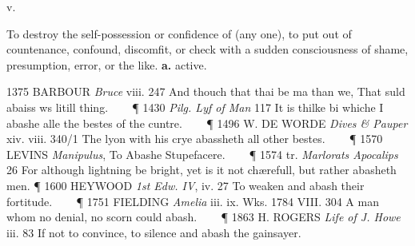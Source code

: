 \begin{description}[wide, labelwidth=!, labelindent=0pt] %




 v. 

\noindent {}

\noindent  
[ad. Anglo-Fr. abaïss- = OFr. ebaïss-, esbaïss-, lengthened stem (occurring in
pple. abaïss-ant, 3 pl. abaïss-ent, subj. abaïsse, etc.) of ésb-aïr, mod.Fr.
ébahir; f. es:—Lat. ex ‘out, utterly’ + baïr, bahir = Ital. baïre to astound,
regarded as formed on bah! a natural exclamation of astonishment. The OFr. -iss
here became -ish, as in perish, finish, punish, and the i was absorbed, as in
punch; in the north the -s remained, as in cheriss, fluriss, punyss; hence a
formal confusion between northern forms of abash, and the distinct vb. abase,
q.v.] 
\vspace{-0.3cm}

\begin{myenumerate}

To destroy the self-possession or confidence of (any one), to put out of
countenance, confound, discomfit, or check with a sudden consciousness of shame,
presumption, error, or the like. \textbf{a.} active. 

1375 BARBOUR \textit{Bruce} viii. 247 And thouch that thai be ma than we, That suld
abaiss ws litill thing.    
\P
1430 \textit{Pilg. Lyf of Man} 117 It is thilke bi whiche I
abashe alle the bestes of the cuntre.    
\P
1496 W. DE WORDE \textit{Dives \& Pauper} xiv. viii. 340/1 The lyon with his crye 
abassheth all other bestes.    
\P
1570 LEVINS \textit{Manipulus}, To Abashe Stupefacere.    
\P
1574 tr. \textit{Marlorats Apocalips} 26 For although lightning be bright, yet is 
it not chærefull, but rather abasheth men.
\P
1600 HEYWOOD \textit{1st Edw. IV}, iv. 27 To weaken and abash their fortitude.    
\P
1751 FIELDING \textit{Amelia} iii. ix. Wks. 1784 VIII. 304 A man whom no denial, no scorn
could abash.    
\P
1863 H. ROGERS \textit{Life of J. Howe} iii. 83 If not to convince, to
silence and abash the gainsayer.


\end{myenumerate}
\end{description}
